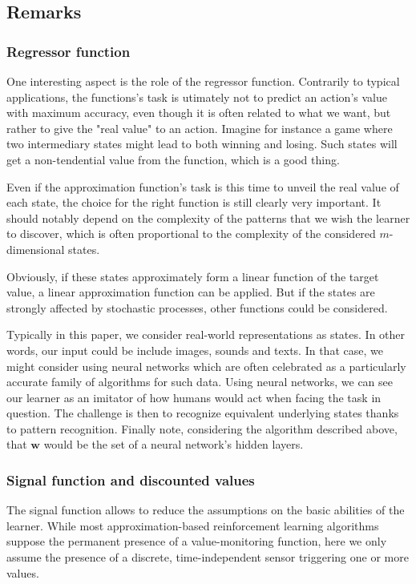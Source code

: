 \documentclass[letterpaper, 10.5 pt, conference]{ieeeconf}
\newcommand{\B}[1]{\mathbf{#1}}
\begin{document}
\subsection{Remarks} 

\subsubsection{Regressor function} 

One interesting aspect is the role of the regressor function. Contrarily to typical applications, the functions's task is utimately not to predict an action's value with maximum accuracy, even though it is often related to what we want, but rather to give the "real value" to an action. Imagine for instance a game where two intermediary states might lead to both winning and losing. Such states will get a non-tendential value from the function, which is a good thing.

Even if the approximation function's task is this time to unveil the real value of each state, the choice for the right function is still clearly very important. It should notably depend on the complexity of the patterns that we wish the learner to discover, which is often proportional to the complexity of the considered $m$-dimensional states. 

Obviously, if these states approximately form a linear function of the target value, a linear approximation function can be applied. But if the states are strongly affected by stochastic processes, other functions could be considered. 

Typically in this paper, we consider real-world representations as states. In other words, our input could be include images, sounds and texts. In that case, we might consider using neural networks which are often celebrated as a particularly accurate family of algorithms for such data. Using neural networks, we can see our learner as an imitator of how humans would act when facing the task in question. The challenge is then to recognize equivalent underlying states thanks to pattern recognition. Finally note, considering the algorithm described above, that $\B{w}$ would be the set of a neural network's hidden layers. 

\subsubsection{Signal function and discounted values}

The signal function allows to reduce the assumptions on the basic abilities of the learner. While most approximation-based reinforcement learning algorithms suppose the permanent presence of a value-monitoring function, here we only assume the presence of a discrete, time-independent sensor triggering one or more values.
\end{document}
